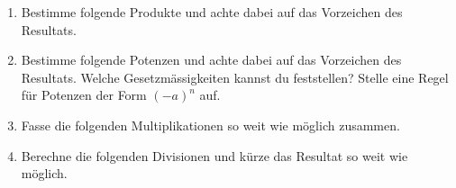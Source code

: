 \documentclass[11pt,oneside]{article}
\begin{document}
    \begin{aufgabe}
        \begin{enumerate}
            \item Bestimme folgende Produkte und achte dabei auf das Vorzeichen des Resultats.
            \newpage
            \item Bestimme folgende Potenzen und achte dabei auf das Vorzeichen des Resultats. Welche Gesetzmässigkeiten kannst du feststellen? Stelle eine Regel für Potenzen der Form $(-a)^n$ auf.
            \item Fasse die folgenden Multiplikationen so weit wie möglich zusammen. %
            \item Berechne die folgenden Divisionen und kürze das Resultat so weit wie möglich. %
        \end{enumerate}
    \end{aufgabe}
\end{document}
